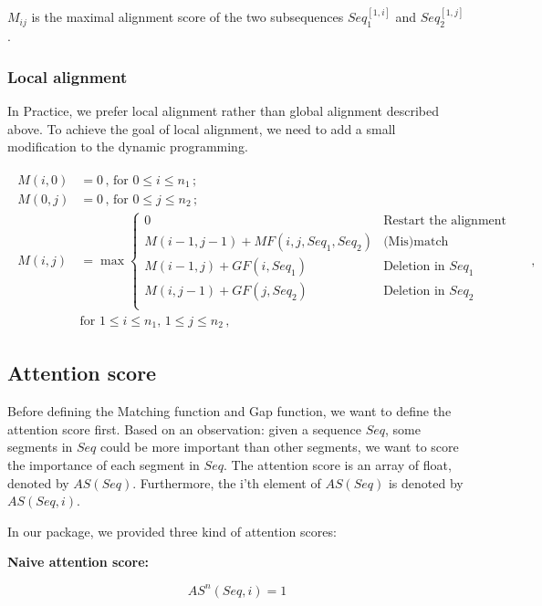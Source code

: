 \documentclass[a4paper]{article}
\begin{document}
\begin{CJK*}{UTF8}{kai}
$M_{ij}$ is the maximal alignment score of the two subsequences $Seq_1^{[1,i]}$ and $Seq_2^{[1,j]}$.

\subsubsection{Local alignment} 

In Practice, we prefer local alignment rather than global alignment described above. To achieve the goal of local alignment, we need to add a small modification to the dynamic programming.

\begin{align}
\begin{split}
M(i,0)&=0\,,\, \text{for } 0 \leq i \leq n_1\,;\\ 
M(0,j)&=0\,,\, \text{for } 0 \leq j \leq n_2\,;\\ 
M(i,j)&=\max \left\{ \begin{array}{ll}
0 & \text{Restart the alignment from here} \\
M(i-1,j-1)+MF\left(i,j,Seq_1,Seq_2\right) &  \text{(Mis)match} \\
M(i-1,j)+GF(i,Seq_1) & \text{Deletion in } Seq_1 \\
M(i,j-1)+GF(j,Seq_2) & \text{Deletion in } Seq_2 \\
\end{array},\, \right. \\ 
& \text{for }  1 \leq i \leq n_1,\, 1 \leq j \leq n_2\,,
\end{split} 
\end{align}

\subsection{Attention score}

Before defining the Matching function and Gap function, we want to define the attention score first. Based on an observation: given a sequence $Seq$, some segments in $Seq$ could be more important than other segments, we want to score the importance of each segment in $Seq$. The attention score is an array of float, denoted by $AS(Seq)$. Furthermore, the i'th element of $AS(Seq)$ is denoted by $AS(Seq,i)$.

In our package, we provided three kind of attention scores:

\noindent
\textbf{Naive attention score:}

$$AS^n(Seq,i)=1$$


\end{CJK*}
\end{document}
